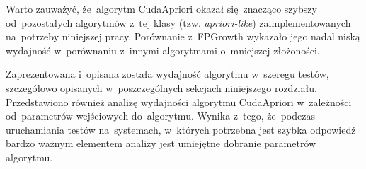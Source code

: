 Warto zauważyć, że~algorytm CudaApriori okazał się~znacząco szybszy od~pozostałych algorytmów z~tej klasy (tzw. \emph{apriori-like}) zaimplementowanych na~potrzeby niniejszej pracy. Porównanie z~FPGrowth wykazało jego nadal niską wydajność w~porównaniu z~innymi algorytmami o~mniejszej złożoności. 

Zaprezentowana i~opisana została wydajność algorytmu w~szeregu testów, szczegółowo opisanych w~poszczególnych sekcjach niniejszego rozdziału. Przedstawiono również analizę wydajności algorytmu CudaApriori w~zależności od~parametrów wejściowych do~algorytmu. Wynika z~tego, że~podczas uruchamiania testów na~systemach, w~których potrzebna jest szybka odpowiedź bardzo ważnym elementem analizy jest umiejętne dobranie parametrów algorytmu.